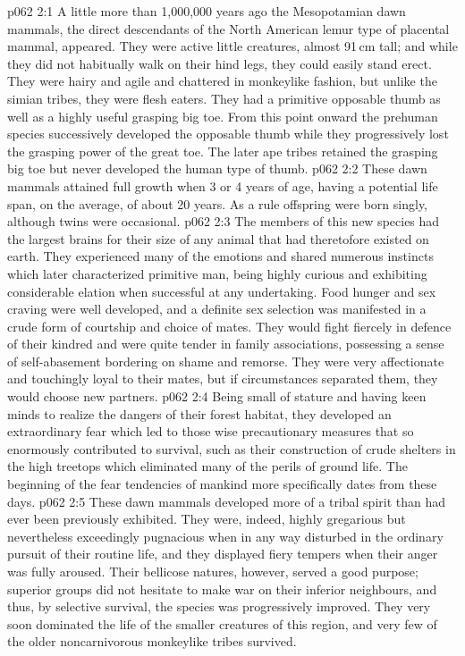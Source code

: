 \vs p062 2:1 A little more than 1,000,000 years ago the Mesopotamian dawn mammals, the direct descendants of the North American lemur type of placental mammal,  appeared. They were active little creatures, almost 91\,cm tall; and while they did not habitually walk on their hind legs, they could easily stand erect. They were hairy and agile and chattered in monkeylike fashion, but unlike the simian tribes, they were flesh eaters. They had a primitive opposable thumb as well as a highly useful grasping big toe. From this point onward the prehuman species successively developed the opposable thumb while they progressively lost the grasping power of the great toe. The later ape tribes retained the grasping big toe but never developed the human type of thumb.
\vs p062 2:2 These dawn mammals attained full growth when 3 or 4 years of age, having a potential life span, on the average, of about 20 years. As a rule offspring were born singly, although twins were occasional.
\vs p062 2:3 The members of this new species had the largest brains for their size of any animal that had theretofore existed on earth. They experienced many of the emotions and shared numerous instincts which later characterized primitive man, being highly curious and exhibiting considerable elation when successful at any undertaking. Food hunger and sex craving were well developed, and a definite sex selection was manifested in a crude form of courtship and choice of mates. They would fight fiercely in defence of their kindred and were quite tender in family associations, possessing a sense of self\hyp{}abasement bordering on shame and remorse. They were very affectionate and touchingly loyal to their mates, but if circumstances separated them, they would choose new partners.
\vs p062 2:4 Being small of stature and having keen minds to realize the dangers of their forest habitat, they developed an extraordinary fear which led to those wise precautionary measures that so enormously contributed to survival, such as their construction of crude shelters in the high treetops which eliminated many of the perils of ground life. The beginning of the fear tendencies of mankind more specifically dates from these days.
\vs p062 2:5 These dawn mammals developed more of a tribal spirit than had ever been previously exhibited. They were, indeed, highly gregarious but nevertheless exceedingly pugnacious when in any way disturbed in the ordinary pursuit of their routine life, and they displayed fiery tempers when their anger was fully aroused. Their bellicose natures, however, served a good purpose; superior groups did not hesitate to make war on their inferior neighbours, and thus, by selective survival, the species was progressively improved. They very soon dominated the life of the smaller creatures of this region, and very few of the older noncarnivorous monkeylike tribes survived.
